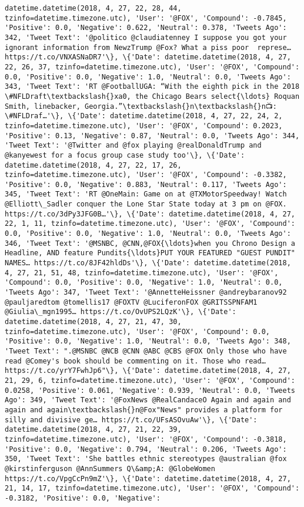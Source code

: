 \documentclass[11pt]{article}
\begin{document}
\begin{Verbatim}[commandchars=\\\{\}]
datetime.datetime(2018, 4, 27, 22, 28, 44, tzinfo=datetime.timezone.utc), 'User': '@FOX', 'Compound': -0.7845, 'Positive': 0.0, 'Negative': 0.622, 'Neutral': 0.378, 'Tweets Ago': 342, 'Tweet Text': '@politico @claudiatenney I suppose you got your ignorant information from NewzTrump @Fox? What a piss poor  represe… https://t.co/VNXASNaDR7'\}, \{'Date': datetime.datetime(2018, 4, 27, 22, 26, 37, tzinfo=datetime.timezone.utc), 'User': '@FOX', 'Compound': 0.0, 'Positive': 0.0, 'Negative': 1.0, 'Neutral': 0.0, 'Tweets Ago': 343, 'Tweet Text': 'RT @FootballUGA: “With the eighth pick in the 2018 \#NFLDraft\textbackslash{}xa0, the Chicago Bears select{\ldots} Roquan Smith, linebacker, Georgia.”\textbackslash{}n\textbackslash{}n📺: \#NFLDraf…'\}, \{'Date': datetime.datetime(2018, 4, 27, 22, 24, 2, tzinfo=datetime.timezone.utc), 'User': '@FOX', 'Compound': 0.2023, 'Positive': 0.13, 'Negative': 0.87, 'Neutral': 0.0, 'Tweets Ago': 344, 'Tweet Text': '@Twitter and @fox playing @realDonaldTrump and @kanyewest for a focus group case study too'\}, \{'Date': datetime.datetime(2018, 4, 27, 22, 17, 26, tzinfo=datetime.timezone.utc), 'User': '@FOX', 'Compound': -0.3382, 'Positive': 0.0, 'Negative': 0.883, 'Neutral': 0.117, 'Tweets Ago': 345, 'Tweet Text': 'RT @OneMain: Game on at @TXMotorSpeedway! Watch @Elliott\_Sadler conquer the Lone Star State today at 3 pm on @FOX. https://t.co/3dPy3JFG0B…'\}, \{'Date': datetime.datetime(2018, 4, 27, 22, 1, 11, tzinfo=datetime.timezone.utc), 'User': '@FOX', 'Compound': 0.0, 'Positive': 0.0, 'Negative': 1.0, 'Neutral': 0.0, 'Tweets Ago': 346, 'Tweet Text': '@MSNBC, @CNN,@FOX{\ldots}when you Chrono Design a Headline, AND feature Pundits{\ldots}PUT YOUR FEATURED "GUEST PUNDIT" NAMES… https://t.co/8JF42hldDs'\}, \{'Date': datetime.datetime(2018, 4, 27, 21, 51, 48, tzinfo=datetime.timezone.utc), 'User': '@FOX', 'Compound': 0.0, 'Positive': 0.0, 'Negative': 1.0, 'Neutral': 0.0, 'Tweets Ago': 347, 'Tweet Text': '@AnnetteHeissner @andreybaranov92 @pauljaredtom @tomellis17 @FOXTV @LuciferonFOX @GRITSSPNFAM1 @Giulia\_mgn1995… https://t.co/OvUPS2LQzK'\}, \{'Date': datetime.datetime(2018, 4, 27, 21, 47, 30, tzinfo=datetime.timezone.utc), 'User': '@FOX', 'Compound': 0.0, 'Positive': 0.0, 'Negative': 1.0, 'Neutral': 0.0, 'Tweets Ago': 348, 'Tweet Text': ".@MSNBC @NCB @CNN @ABC @CBS @FOX Only those who have read @Comey's book should be commenting on it. Those who read… https://t.co/yrY7FwhJp6"\}, \{'Date': datetime.datetime(2018, 4, 27, 21, 29, 6, tzinfo=datetime.timezone.utc), 'User': '@FOX', 'Compound': 0.0258, 'Positive': 0.061, 'Negative': 0.939, 'Neutral': 0.0, 'Tweets Ago': 349, 'Tweet Text': '@FoxNews @RealCandaceO Again and again and again and again\textbackslash{}n@Fox"News" provides a platform for silly and divisive ge… https://t.co/UFsASOvuAw'\}, \{'Date': datetime.datetime(2018, 4, 27, 21, 22, 39, tzinfo=datetime.timezone.utc), 'User': '@FOX', 'Compound': -0.3818, 'Positive': 0.0, 'Negative': 0.794, 'Neutral': 0.206, 'Tweets Ago': 350, 'Tweet Text': 'She battles ethnic stereotypes @australian @fox @kirstinferguson @AnnSummers Q\&amp;A: @GlobeWomen https://t.co/VpgCcPn9mZ'\}, \{'Date': datetime.datetime(2018, 4, 27, 21, 14, 17, tzinfo=datetime.timezone.utc), 'User': '@FOX', 'Compound': -0.3182, 'Positive': 0.0, 'Negative': 
\end{Verbatim}
\end{document}
